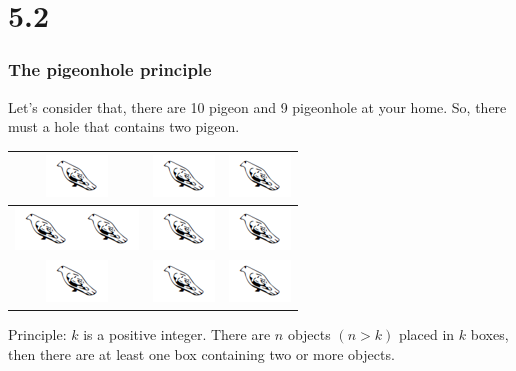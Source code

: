 \documentclass{beamer}
\begin{document}
\section{5.2}

\begin{frame}
\frametitle{The pigeonhole principle}
Let's consider that, there are 10 pigeon and 9 pigeonhole at your home. So, there must a hole that contains two pigeon.\pause\\
\begin{center}
\begin{tabular}{|c | c | c|}
\hline
\includegraphics[width=30 px]{Pigeon.png} & \includegraphics[width=30 px]{Pigeon.png} & \includegraphics[width=30 px]{Pigeon.png}\\
\hline
\includegraphics[width=30 px]{Pigeon.png}\includegraphics[width=30 px]{Pigeon.png} & \includegraphics[width=30 px]{Pigeon.png} & \includegraphics[width=30 px]{Pigeon.png}\\
\hline
\includegraphics[width=30 px]{Pigeon.png} & \includegraphics[width=30 px]{Pigeon.png} & \includegraphics[width=30 px]{Pigeon.png}\\
\hline
\end{tabular}\pause
\end{center}

\begin{block}{Principle:}
$k$ is a positive integer. There are $n$ objects $(n>k)$ placed in $k$ boxes, then there are at least one box containing two or more objects.
\end{block}
\end{frame}
\end{document}
